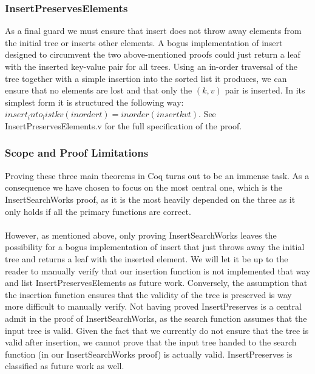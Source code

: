 \subsubsection{InsertPreservesElements}
As a final guard we must ensure that insert does not throw away elements from the initial tree or inserts other elements. A bogus implementation of insert designed to circumvent the two above-mentioned proofs could just return a leaf with the inserted key-value pair for all trees. Using an in-order traversal of the tree together with a simple insertion into the sorted list it produces, we can ensure that no elements are lost and that only the $(k, v)$ pair is inserted. In its simplest form it is structured the following way: $insert_into_list k v (inorder t) = inorder (insert k v t)$. See InsertPreservesElements.v for the full specification of the proof. 
\subsubsection{Scope and Proof Limitations}
Proving these three main theorems in Coq turns out to be an immense task. As a consequence we have chosen to focus on the most central one, which is the InsertSearchWorks proof, as it is the most heavily depended on the three as it only holds if all the primary functions are correct. 
\paragraph{}
However, as mentioned above, only proving InsertSearchWorks leaves the possibility for a bogus implementation of insert that just throws away the initial tree and returns a leaf with the inserted element. We will let it be up to the reader to manually verify that our insertion function is not implemented that way and list InsertPreservesElements as future work. Conversely, the assumption that the insertion function ensures that the validity of the tree is preserved is way more difficult to manually verify. Not having proved InsertPreserves is a central admit in the proof of InsertSearchWorks, as the search function assumes that the input tree is valid. Given the fact that we currently do not ensure that the tree is valid after insertion, we cannot prove that the input tree handed to the search function (in our InsertSearchWorks proof) is actually valid. InsertPreserves is classified as future work as well.









